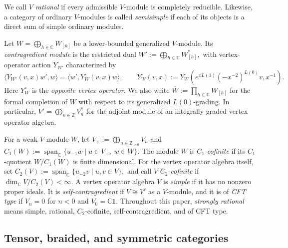 \documentclass[12pt,leqno]{amsart}
\numberwithin{equation}{section} \newtheorem{thm}{Theorem}[section] \newtheorem{lem}[thm]{Lemma} \newtheorem{ex}[thm]{Example} \newtheorem{prop}[thm]{Proposition} \newtheorem{cor}[thm]{Corollary} \newtheorem{defi}[thm]{Definition} \newtheorem{rmk}[thm]{Remark} \newtheorem{notation}[thm]{Notation}
\newcommand{\one}{\mathbf{1}}
\def\Z{\mathbb{Z}} \def\N{\mathbb{N}} \def\A{\mathbb{A}} \def\C{\mathbb{C}} \def\R{\mathbb{R}} \def\Q{\mathbb{Q}} \def\F{\mathbb{F}}
\begin{document}
We call \(V\) \emph{rational} if every admissible \(V\)-module is completely reducible. Likewise, a category of ordinary $V$-modules is called \emph{semisimple} if each of its objects is a direct sum of simple ordinary modules.

Let $W=\bigoplus_{h\in\C}W_{[h]}$ be a lower-bounded generalized $V$-module. Its \emph{contragredient module} is the restricted dual \(W':=\bigoplus_{h\in\C}W_{[h]}^*,\) with vertex-operator action $Y_{W'}$ characterized by
\[
\langle Y_{W'}(v,x)w',w\rangle
=
\langle w',Y_W^{\circ}(v,x)w\rangle,
\qquad
Y_W^{\circ}(v,x)
:=Y_W\!\left(e^{xL(1)}(-x^{-2})^{L(0)}v,x^{-1}\right).
\]
Here $Y_W^{\circ}$ is the \emph{opposite vertex operator}. We also write \(\overline W:=\prod_{h\in\C}W_{[h]}\) for the formal completion of $W$ with respect to its generalized $L(0)$-grading. In particular, \(V'=\bigoplus_{n\in\Z}V_n^*\) for the adjoint module of an integrally graded vertex operator algebra.

For a weak $V$-module $W$, let \(V_+:=\bigoplus_{n\in\Z_{>0}}V_n\) and \(C_1(W):=\operatorname{span}_{\C}\{u_{-1}w\mid u\in V_+,\ w\in W\}\). The module $W$ is \emph{$C_1$-cofinite} if its $C_1$-quotient $W/C_1(W)$ is finite dimensional. For the vertex operator algebra itself, set \(C_2(V):=\operatorname{span}_{\C}\{u_{-2}v\mid u,v\in V\},\) and call $V$ \emph{$C_2$-cofinite} if \(\dim_\C V/C_2(V)<\infty\). A vertex operator algebra $V$ is \emph{simple} if it has no nonzero proper ideals. It is \emph{self-contragredient} if $V\cong V'$ as a $V$-module, and it is of \emph{CFT type} if \(V_n=0\) for $n<0$ and \(V_0=\C\one\). Throughout this paper, \emph{strongly rational} means simple, rational, $C_2$-cofinite, self-contragredient, and of CFT type.

\subsection{Tensor, braided, and symmetric categories}
\end{document}
